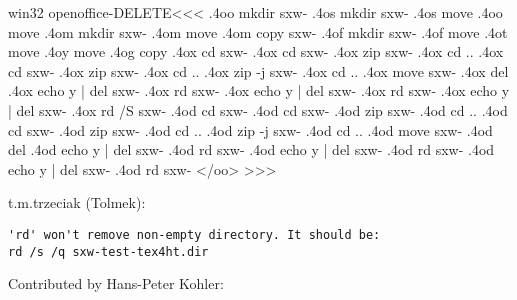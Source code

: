 \documentclass{article}
\begin{document}
\<win32 openoffice-DELETE\><<<
.4oo mkdir sxw-%
.4os mkdir sxw-%
.4os move  %
.4oo move  %
%
.4om mkdir sxw-%
.4om move  %
.4om copy  sxw-%
%
.4of mkdir sxw-%
.4of move  %
%
.4ot move  %
.4oy move  %
.4og copy  %
.4ox cd    sxw-%
.4ox cd    sxw-%
.4ox zip   sxw-%
.4ox cd    ..
.4ox cd    sxw-%
.4ox zip   sxw-%
.4ox cd ..
.4ox zip -j sxw-%
.4ox cd ..
%
.4ox move sxw-%
%
.4ox del %
.4ox echo y | del sxw-%
.4ox rd sxw-%
.4ox echo y | del sxw-%
.4ox rd sxw-%
.4ox echo y | del sxw-%
.4ox rd /S sxw-%
.4od cd    sxw-%
.4od cd    sxw-%
.4od zip   sxw-%
.4od cd    ..
.4od cd    sxw-%
.4od zip   sxw-%
.4od cd ..
.4od zip -j sxw-%
.4od cd ..
%
.4od move sxw-%
%
.4od del %
.4od echo y | del sxw-%
.4od rd sxw-%
.4od echo y | del sxw-%
.4od rd sxw-%
.4od echo y | del sxw-%
.4od rd sxw-%
</oo> 
>>> 


t.m.trzeciak (Tolmek):

\begin{verbatim}
'rd' won't remove non-empty directory. It should be: 
rd /s /q sxw-test-tex4ht.dir 
\end{verbatim}



Contributed by Hans-Peter Kohler:
\end{document}
